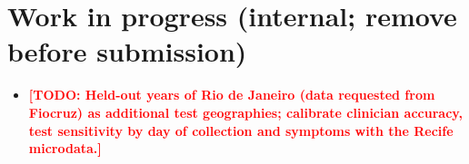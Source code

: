 \documentclass[11pt,a4paper]{article}
\newcommand{\todo}[1]{\textcolor{red}{\textbf{[TODO: #1]}}}
\begin{document}
\appendix
\section{Work in progress (internal; remove before submission)}
\label{app:todo}

\begin{itemize}
    \item \todo{Held-out years of Rio de Janeiro (data requested from Fiocruz) as additional test geographies; calibrate clinician accuracy, test sensitivity by day of collection and symptoms with the Recife microdata.}
\end{itemize}
\end{document}
